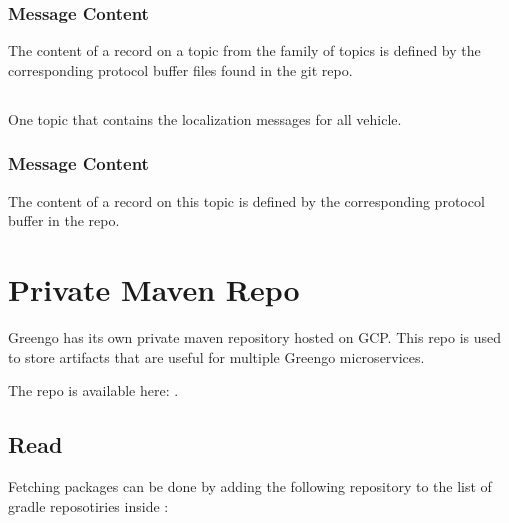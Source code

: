 \documentclass[letterpaper,10pt,english]{sphinxmanual}
\begin{document}
\subsection{Message Content}
\label{\detokenize{pubsub:message-content}}
The content of a record on a topic from the  family of topics is defined by the corresponding protocol buffer files found in the  git repo.


\section{}
\label{\detokenize{pubsub:vehicle-localization}}
One topic that contains the localization messages for all vehicle.


\subsection{Message Content}
\label{\detokenize{pubsub:id1}}
The content of a record on this topic is defined by the corresponding protocol buffer in the  repo.


\chapter{Private Maven Repo}
\label{\detokenize{private_maven_repo:private-maven-repo}}\label{\detokenize{private_maven_repo:id1}}\label{\detokenize{private_maven_repo::doc}}
Greengo has its own private maven repository hosted on GCP.
This repo is used to store artifacts that are useful for multiple Greengo microservices.

The repo is available here: .


\section{Read}
\label{\detokenize{private_maven_repo:read}}
Fetching packages can be done by adding the following repository to the list of gradle reposotiries inside :
\end{document}
